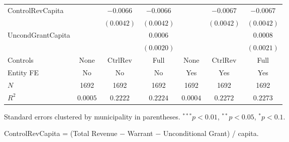 \begin{table}[H]
\begin{minipage}{\textwidth}
\begin{tabular}{lcccccc}
        ControlRevCapita &  & $-0.0066$ & $-0.0066$ &  & $-0.0067$ & $-0.0067$ \\
         &  & $(0.0042)$ & $(0.0042)$ &  & $(0.0042)$ & $(0.0042)$ \\[4pt]
        UncondGrantCapita &  &  & $0.0006$ &  &  & $0.0008$ \\
         &  &  & $(0.0020)$ &  &  & $(0.0021)$ \\[4pt]
        \midrule
        Controls & None & CtrlRev & Full & None & CtrlRev & Full \\
        Entity FE & No & No & No & Yes & Yes & Yes \\
        $N$ & 1692 & 1692 & 1692 & 1692 & 1692 & 1692 \\
        $R^2$ & $0.0005$ & $0.2222$ & $0.2224$ & $0.0004$ & $0.2272$ & $0.2273$ \\
        \bottomrule
    \end{tabular}

    \vspace{6pt}
    {\scriptsize Standard errors clustered by municipality in parentheses. $^{***}p<0.01$, $^{**}p<0.05$, $^{*}p<0.1$.}

    {\scriptsize ControlRevCapita = (Total Revenue $-$ Warrant $-$ Unconditional Grant) / capita.}
    \end{minipage}
\end{table}